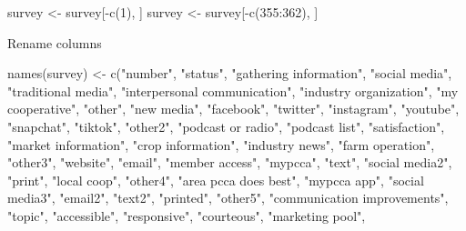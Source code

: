 \documentclass[
]{article}
\newenvironment{Shaded}{\begin{snugshade}}{\end{snugshade}}
\newcommand{\DecValTok}[1]{\textcolor[rgb]{0.00,0.00,0.81}{#1}}
\newcommand{\FunctionTok}[1]{\textcolor[rgb]{0.00,0.00,0.00}{#1}}
\newcommand{\NormalTok}[1]{#1}
\newcommand{\OtherTok}[1]{\textcolor[rgb]{0.56,0.35,0.01}{#1}}
\newcommand{\SpecialCharTok}[1]{\textcolor[rgb]{0.00,0.00,0.00}{#1}}
\newcommand{\StringTok}[1]{\textcolor[rgb]{0.31,0.60,0.02}{#1}}
\begin{document}
\begin{Shaded}
\begin{Highlighting}[]
\NormalTok{survey }\OtherTok{\textless{}{-}}\NormalTok{ survey[}\SpecialCharTok{{-}}\FunctionTok{c}\NormalTok{(}\DecValTok{1}\NormalTok{), ]}
\NormalTok{survey }\OtherTok{\textless{}{-}}\NormalTok{ survey[}\SpecialCharTok{{-}}\FunctionTok{c}\NormalTok{(}\DecValTok{355}\SpecialCharTok{:}\DecValTok{362}\NormalTok{), ]}
\end{Highlighting}
\end{Shaded}

Rename columns

\begin{Shaded}
\begin{Highlighting}[]
\FunctionTok{names}\NormalTok{(survey) }\OtherTok{\textless{}{-}} \FunctionTok{c}\NormalTok{(}\StringTok{"number"}\NormalTok{, }\StringTok{"status"}\NormalTok{, }\StringTok{"gathering information"}\NormalTok{,}
    \StringTok{"social media"}\NormalTok{, }\StringTok{"traditional media"}\NormalTok{, }\StringTok{"interpersonal communication"}\NormalTok{,}
    \StringTok{"industry organization"}\NormalTok{, }\StringTok{"my cooperative"}\NormalTok{, }\StringTok{"other"}\NormalTok{, }\StringTok{"new media"}\NormalTok{,}
    \StringTok{"facebook"}\NormalTok{, }\StringTok{"twitter"}\NormalTok{, }\StringTok{"instagram"}\NormalTok{, }\StringTok{"youtube"}\NormalTok{, }\StringTok{"snapchat"}\NormalTok{,}
    \StringTok{"tiktok"}\NormalTok{, }\StringTok{"other2"}\NormalTok{, }\StringTok{"podcast or radio"}\NormalTok{, }\StringTok{"podcast list"}\NormalTok{, }\StringTok{"satisfaction"}\NormalTok{,}
    \StringTok{"market information"}\NormalTok{, }\StringTok{"crop information"}\NormalTok{, }\StringTok{"industry news"}\NormalTok{,}
    \StringTok{"farm operation"}\NormalTok{, }\StringTok{"other3"}\NormalTok{, }\StringTok{"website"}\NormalTok{, }\StringTok{"email"}\NormalTok{, }\StringTok{"member access"}\NormalTok{,}
    \StringTok{"mypcca"}\NormalTok{, }\StringTok{"text"}\NormalTok{, }\StringTok{"social media2"}\NormalTok{, }\StringTok{"print"}\NormalTok{, }\StringTok{"local coop"}\NormalTok{,}
    \StringTok{"other4"}\NormalTok{, }\StringTok{"area pcca does best"}\NormalTok{, }\StringTok{"mypcca app"}\NormalTok{, }\StringTok{"social media3"}\NormalTok{,}
    \StringTok{"email2"}\NormalTok{, }\StringTok{"text2"}\NormalTok{, }\StringTok{"printed"}\NormalTok{, }\StringTok{"other5"}\NormalTok{, }\StringTok{"communication improvements"}\NormalTok{,}
    \StringTok{"topic"}\NormalTok{, }\StringTok{"accessible"}\NormalTok{, }\StringTok{"responsive"}\NormalTok{, }\StringTok{"courteous"}\NormalTok{, }\StringTok{"marketing pool"}\NormalTok{,}

\end{Highlighting}
\end{Shaded}
\end{document}
